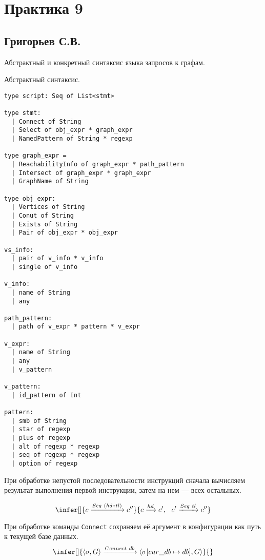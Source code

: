 \section{Практика 9}

\subsection{Григорьев С.В.}

Абстрактный и конкретный синтаксис языка запросов к графам.

Абстрактный синтаксис.

\begin{verbatim}
type script: Seq of List<stmt>

type stmt:
  | Connect of String
  | Select of obj_expr * graph_expr
  | NamedPattern of String * regexp

type graph_expr =
  | ReachabilityInfo of graph_expr * path_pattern 
  | Intersect of graph_expr * graph_expr 
  | GraphName of String

type obj_expr:
  | Vertices of String  
  | Conut of String
  | Exists of String
  | Pair of obj_expr * obj_expr

vs_info:
  | pair of v_info * v_info
  | single of v_info

v_info:
  | name of String
  | any
  
path_pattern:
  | path of v_expr * pattern * v_expr

v_expr: 
  | name of String
  | any 
  | v_pattern

v_pattern:
  | id_pattern of Int   

pattern: 
  | smb of String
  | star of regexp
  | plus of regexp
  | alt of regexp * regexp
  | seq of regexp * regexp
  | option of regexp

\end{verbatim}

\newcommand{\sem}[1]{\llbracket #1 \rrbracket}

При обработке непустой последовательности инструкций сначала вычисляем результат выполнения первой инструкции, затем на нем --- всех остальных.

$$
\infer[]{c \xrightarrow{Seq \ (hd::tl)} c''}{c \xrightarrow{hd} c', \ \ c' \xrightarrow{Seq \ tl} c''}
$$

При обработке команды \verb|Connect| сохраняем её аргумент в конфигурации как путь к текущей базе данных.
$$
\infer[]{\langle\sigma, G\rangle \xrightarrow{Connect \ db} \langle\sigma[cur\_db \mapsto db], G\rangle}{}
$$

